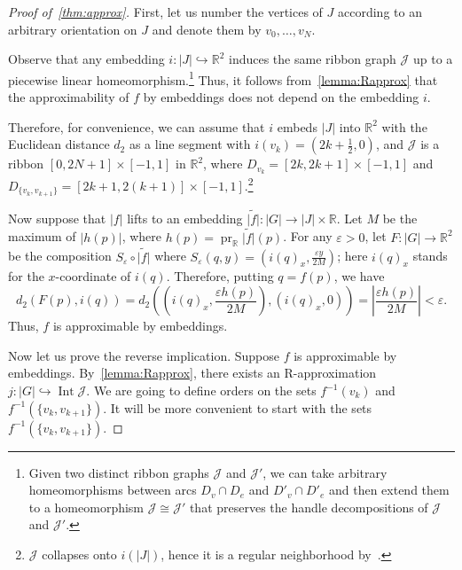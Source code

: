 \documentclass[a4paper,12pt,reqno,oneside]{amsart}
\theoremstyle{plain}
\theoremstyle{definition}
\theoremstyle{plain}
\newcommand{\from}{\colon}
\newcommand{\wt}[1]{\widetilde{#1}}
\newcommand{\R}{\mathbb{R}}
\newcommand{\JJ}{\mathcal{J}}
\DeclareMathOperator{\pr}{pr}
\DeclareMathOperator{\Int}{Int}
\begin{document}
\begin{proof}[Proof of~\cref{thm:approx}]
  First, let us number the vertices of $J$ according to an arbitrary orientation on $J$ and denote
  them by $v_0, \dots, v_N$.

  Observe that any embedding $i \from |J| \hookrightarrow \mathbb{R}^2$ induces the same ribbon
  graph $\JJ$ up to a piecewise linear homeomorphism.\footnote{Given two distinct ribbon graphs
    $\JJ$ and $\JJ'$, we can take arbitrary homeomorphisms between arcs $D_v \cap D_e$ and
    $D'_v \cap D'_e$ and then extend them to a homeomorphism $\JJ \cong \JJ'$ that preserves the
    handle decompositions of $\JJ$ and $\JJ'$.} Thus, it follows from~\cref{lemma:Rapprox} that the approximability of
  $f$ by embeddings does not depend on the embedding $i$.

  Therefore, for convenience, we can assume that $i$ embeds $|J|$ into $\R^2$ with the Euclidean
  distance $d_2$ as a line segment with $i(v_k) = \left(2k+\frac12, 0\right)$, and $\JJ$ is a
  ribbon $[0, 2N+1] \times [-1, 1]$ in $\R^2$, where $D_{v_k} = [2k, 2k+1] \times [-1, 1]$ and
  $D_{\{v_k, v_{k+1}\}} = [2k+1, 2(k+1)] \times [-1, 1]$.\footnote{$\JJ$ collapses onto $i(|J|)$,
    hence it is a regular neighborhood by~\cite[Corollary 3.30]{rourke_sanderson}.}

  Now suppose that $|f|$ lifts to an embedding $\wt{|f|} \from |G| \to |J| \times \R$. Let $M$ be
  the maximum of $|h(p)|$, where $h(p) = \pr_\R \wt{|f|}(p)$. For any $\varepsilon > 0$, let
  $F \from |G| \to \R^2$ be the composition $S_\varepsilon \circ \wt{|f|}$ where
  $S_\varepsilon(q, y) = \left(i(q)_x, \frac{\varepsilon y}{2M}\right)$; here $i(q)_x$
  stands for the $x$-coordinate of $i(q)$. Therefore, putting $q = f(p)$, we have
  \[
    d_2\left(F(p), i(q)\right) = d_2\left( \left(i(q)_x, \frac{\varepsilon h(p)}{2M}\right), \left(
        i(q)_x, 0 \right) \right) = \left| \frac{\varepsilon h(p)}{2M} \right| < \varepsilon.
  \]
  Thus, $f$ is approximable by embeddings.

  Now let us prove the reverse implication. Suppose $f$ is approximable by
  embeddings. By~\cref{lemma:Rapprox}, there exists an R-approximation
  $j \from |G| \hookrightarrow \Int \JJ$. We are going to define orders on the sets $f^{-1}(v_k)$
  and $f^{-1}(\{v_k, v_{k+1}\})$. It will be more convenient to start with the sets
  $f^{-1}(\{v_k, v_{k+1}\})$.


\end{proof}
\end{document}
